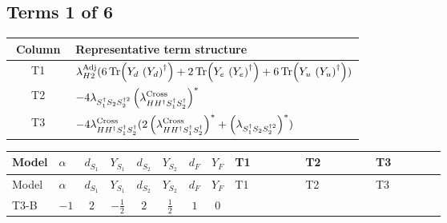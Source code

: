 \documentclass[8pt]{article}
\begin{document}
\begin{landscape}
\subsection*{Terms 1 of 6}
\begin{center}
\begin{tabular}{@{}c >{\raggedright\arraybackslash}p{0.82\linewidth}@{}}
\toprule
Column & Representative term structure \\
\midrule
T1 & \(\displaystyle {\lambda_{H2}^{\rm Adj}} (6 \operatorname{Tr}\!\left({Y_d}\,\left({Y_d}\right)^{\dagger}\right)+2 \operatorname{Tr}\!\left({Y_e}\,\left({Y_e}\right)^{\dagger}\right)+6 \operatorname{Tr}\!\left({Y_u}\,\left({Y_u}\right)^{\dagger}\right))\) \\
\midrule
T2 & \(\displaystyle -4 {\lambda_{S_1^\dagger S_2 S_2^{\dagger 2}}} \left({\lambda_{H H^\dagger S_1^\dagger S_2^\dagger}^{\rm Cross}}\right)^{*}\) \\
\midrule
T3 & \(\displaystyle -4 {\lambda_{H H^\dagger S_1^\dagger S_2^\dagger}^{\rm Cross}} (2 \left({\lambda_{H H^\dagger S_1^\dagger S_2^\dagger}^{\rm Cross}}\right)^{*}+\left({\lambda_{S_1^\dagger S_2 S_2^{\dagger 2}}}\right)^{*})\) \\
\midrule
\bottomrule
\end{tabular}
\end{center}
\smallskip
\tiny
\begin{longtable}{@{}llcccccc >{\raggedright\arraybackslash}p{0.21\linewidth} >{\raggedright\arraybackslash}p{0.21\linewidth} >{\raggedright\arraybackslash}p{0.21\linewidth}@{}}
\toprule
Model & $\alpha$ & $d_{S_1}$ & $Y_{S_1}$ & $d_{S_2}$ & $Y_{S_2}$ & $d_F$ & $Y_F$ & T1 & T2 & T3 \\
\midrule
\endfirsthead
\toprule
Model & $\alpha$ & $d_{S_1}$ & $Y_{S_1}$ & $d_{S_2}$ & $Y_{S_2}$ & $d_F$ & $Y_F$ & T1 & T2 & T3 \\
\midrule
\endhead
T3-B & $-1$ & $2$ & $-\frac{1}{2}$ & $2$ & $\frac{1}{2}$ & $1$ & $0$ & \scriptsize\adjustbox{max width=\linewidth}{$\begin{gathered} {\lambda_{H2}^{\rm Adj}} (6 \operatorname{Tr}\!\left({Y_d}\,\left({Y_d}\right)^{\dagger}\right)+2 \operatorname{Tr}\!\left({Y_e}\,\left({Y_e}\right)^{\dagger}\right)+6 \operatorname{Tr}\!\left({Y_u}\,\left({Y_u}\right)^{\dagger}\right))\end{gathered}$} & \scriptsize\adjustbox{max width=\linewidth}{$\begin{gathered} -4 {\lambda_{S_1^\dagger S_2 S_2^{\dagger 2}}} \left({\lambda_{H H^\dagger S_1^\dagger S_2^\dagger}^{\rm Cross}}\right)^{*}\end{gathered}$} & \scriptsize\adjustbox{max width=\linewidth}{$\begin{gathered} -4 {\lambda_{H H^\dagger S_1^\dagger S_2^\dagger}^{\rm Cross}} (2 \left({\lambda_{H H^\dagger S_1^\dagger S_2^\dagger}^{\rm Cross}}\right)^{*}+\left({\lambda_{S_1^\dagger S_2 S_2^{\dagger 2}}}\right)^{*})\end{gathered}$} \\

\end{longtable}
\end{landscape}
\end{document}
